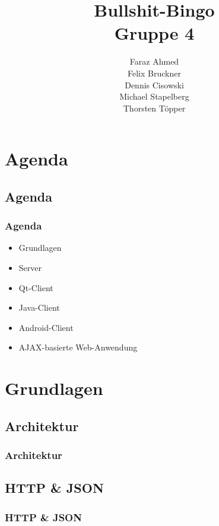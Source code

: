 \documentclass{beamer}
\title[]{Bullshit-Bingo\\ Gruppe 4}
\author{Faraz Ahmed\\
Felix Bruckner\\
Dennis Cisowski\\
Michael Stapelberg\\
Thorsten Töpper
}
\institute{Fakultät für Informatik\\
           Hochschule Mannheim}
\date{\datum}
\begin{document}
\begin{frame}
\titlepage
\end{frame}



\section{Agenda}

\subsection{Agenda}

\begin{frame}[fragile]
\frametitle{Agenda}
\begin{itemize}
\item Grundlagen
\item Server
\item Qt-Client
\item Java-Client
\item Android-Client
\item AJAX-basierte Web-Anwendung
\end{itemize}
\end{frame}

\section{Grundlagen}

\subsection{Architektur}
\begin{frame}[fragile]
\frametitle{Architektur}
\end{frame}

\subsection{HTTP \& JSON}
\begin{frame}[fragile]
\frametitle{HTTP \& JSON}
\end{frame}
\end{document}
